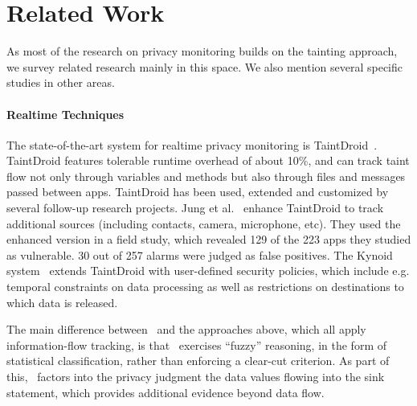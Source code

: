 \section{Related Work}\label{Se:related}

As most of the research on privacy monitoring builds on the tainting approach, we survey related research mainly in this space. We also mention several specific studies in other areas.

\paragraph{Realtime Techniques} The state-of-the-art system for realtime privacy monitoring is TaintDroid~\cite{EGCCJMS:OSDI10}. TaintDroid features tolerable runtime overhead of about 10\%, and can track taint flow not only through variables and methods but also through files and messages passed between apps. TaintDroid has been used, extended and customized by several follow-up research projects. Jung et al.~\cite{JHW:SPSM12} enhance TaintDroid to track additional sources (including contacts, camera, microphone, etc). They used the enhanced version in a field study, which revealed 129 of the 223 apps they studied as vulnerable. 30 out of 257 alarms were judged as false positives. The Kynoid system~\cite{SPKS:WISTP12} extends TaintDroid with user-defined security policies, which include e.g. temporal constraints on data processing as well as restrictions on destinations to which data is released.

The main difference between \Tool\ and the approaches above, which all apply information-flow tracking, is that \Tool\ exercises ``fuzzy'' reasoning, in the form of statistical classification, rather than enforcing a clear-cut criterion. As part of this, \Tool\ factors into the privacy judgment the data values flowing into the sink statement, which provides additional evidence beyond data flow.

